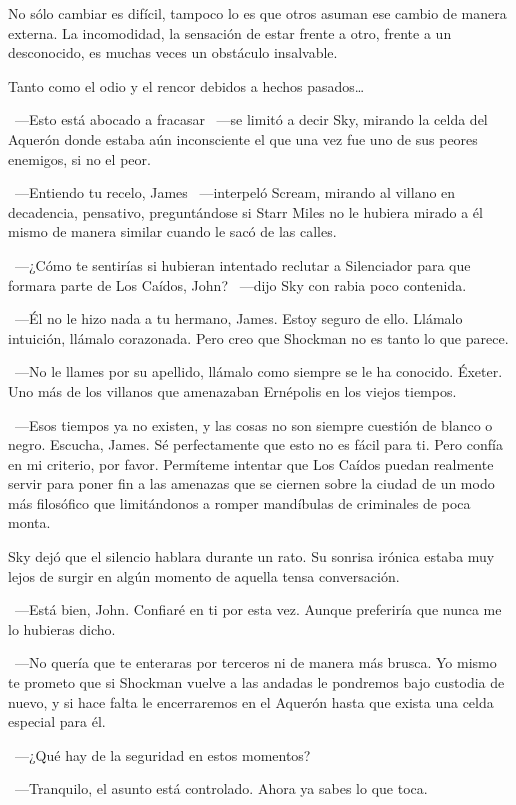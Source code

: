 No sólo cambiar es difícil, tampoco lo es que otros asuman ese cambio de manera externa. La incomodidad, la sensación de estar frente a otro, frente a un desconocido, es muchas veces un obstáculo insalvable.

Tanto como el odio y el rencor debidos a hechos pasados\dots

\fancyparbreak~---Esto está abocado a fracasar ~---se limitó a decir Sky, mirando la celda del Aquerón donde estaba aún inconsciente el que una vez fue uno de sus peores enemigos, si no el peor.

~---Entiendo tu recelo, James ~---interpeló Scream, mirando al villano en decadencia, pensativo, preguntándose si Starr Miles no le hubiera mirado a él mismo de manera similar cuando le sacó de las calles.

~---¿Cómo te sentirías si hubieran intentado reclutar a Silenciador para que formara parte de Los Caídos, John? ~---dijo Sky con rabia poco contenida.

~---Él no le hizo nada a tu hermano, James. Estoy seguro de ello. Llámalo intuición, llámalo corazonada. Pero creo que Shockman no es tanto lo que parece.

~---No le llames por su apellido, llámalo como siempre se le ha conocido. Éxeter. Uno más de los villanos que amenazaban Ernépolis en los viejos tiempos.

~---Esos tiempos ya no existen, y las cosas no son siempre cuestión de blanco o negro. Escucha, James. Sé perfectamente que esto no es fácil para ti. Pero confía en mi criterio, por favor. Permíteme intentar que Los Caídos puedan realmente servir para poner fin a las amenazas que se ciernen sobre la ciudad de un modo más filosófico que limitándonos a romper mandíbulas de criminales de poca monta.

Sky dejó que el silencio hablara durante un rato. Su sonrisa irónica estaba muy lejos de surgir en algún momento de aquella tensa conversación.

~---Está bien, John. Confiaré en ti por esta vez. Aunque preferiría que nunca me lo hubieras dicho.

~---No quería que te enteraras por terceros ni de manera más brusca. Yo mismo te prometo que si Shockman vuelve a las andadas le pondremos bajo custodia de nuevo, y si hace falta le encerraremos en el Aquerón hasta que exista una celda especial para él.

~---¿Qué hay de la seguridad en estos momentos?

~---Tranquilo, el asunto está controlado. Ahora ya sabes lo que toca.

